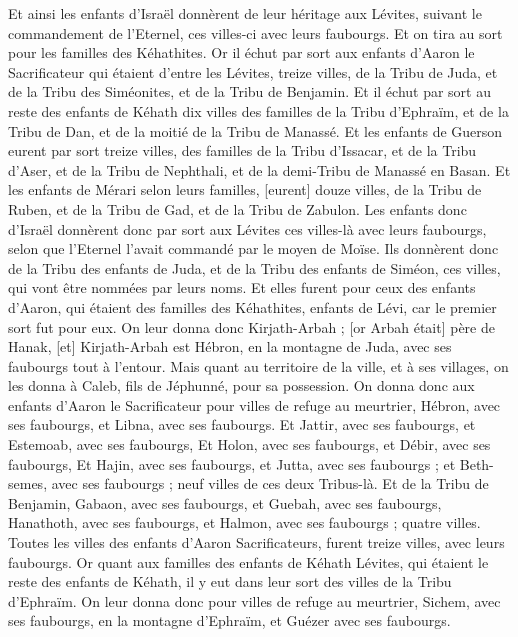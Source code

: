 \begin{multicols}{2}
Et ainsi les enfants d'Israël donnèrent de leur héritage aux Lévites, suivant le commandement de l'Eternel, ces villes-ci avec leurs faubourgs.
Et on tira au sort pour les familles des Kéhathites. Or il échut par sort aux enfants d'Aaron le Sacrificateur qui étaient d'entre les Lévites, treize villes, de la Tribu de Juda, et de la Tribu des Siméonites, et de la Tribu de Benjamin.
Et il échut par sort au reste des enfants de Kéhath dix villes des familles de la Tribu d'Ephraïm, et de la Tribu de Dan, et de la moitié de la Tribu de Manassé.
Et les enfants de Guerson eurent par sort treize villes, des familles de la Tribu d'Issacar, et de la Tribu d'Aser, et de la Tribu de Nephthali, et de la demi-Tribu de Manassé en Basan.
Et les enfants de Mérari selon leurs familles, [eurent] douze villes, de la Tribu de Ruben, et de la Tribu de Gad, et de la Tribu de Zabulon.
Les enfants donc d'Israël donnèrent donc par sort aux Lévites ces villes-là avec leurs faubourgs, selon que l'Eternel l'avait commandé par le moyen de Moïse.
Ils donnèrent donc de la Tribu des enfants de Juda, et de la Tribu des enfants de Siméon, ces villes, qui vont être nommées par leurs noms.
Et elles furent pour ceux des enfants d'Aaron, qui étaient des familles des Kéhathites, enfants de Lévi, car le premier sort fut pour eux.
On leur donna donc Kirjath-Arbah ; [or Arbah était] père de Hanak, [et] Kirjath-Arbah est Hébron, en la montagne de Juda, avec ses faubourgs tout à l'entour.
Mais quant au territoire de la ville, et à ses villages, on les donna à Caleb, fils de Jéphunné, pour sa possession.
On donna donc aux enfants d'Aaron le Sacrificateur pour villes de refuge au meurtrier, Hébron, avec ses faubourgs, et Libna, avec ses faubourgs.
Et Jattir, avec ses faubourgs, et Estemoab, avec ses faubourgs,
Et Holon, avec ses faubourgs, et Débir, avec ses faubourgs,
Et Hajin, avec ses faubourgs, et Jutta, avec ses faubourgs ; et Beth-semes, avec ses faubourgs ; neuf villes de ces deux Tribus-là.
Et de la Tribu de Benjamin, Gabaon, avec ses faubourgs, et Guebah, avec ses faubourgs,
Hanathoth, avec ses faubourgs, et Halmon, avec ses faubourgs ; quatre villes.
Toutes les villes des enfants d'Aaron Sacrificateurs, furent treize villes, avec leurs faubourgs.
Or quant aux familles des enfants de Kéhath Lévites, qui étaient le reste des enfants de Kéhath, il y eut dans leur sort des villes de la Tribu d'Ephraïm.
On leur donna donc pour villes de refuge au meurtrier, Sichem, avec ses faubourgs, en la montagne d'Ephraïm, et Guézer avec ses faubourgs.

\end{multicols}

